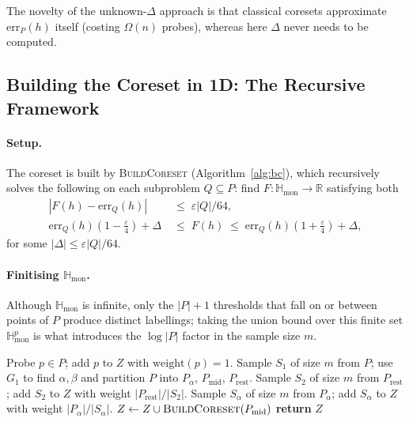 \documentclass[11pt, a4paper]{article}
\theoremstyle{boxed}
\newcommand{\R}{\mathbb{R}}
\newcommand{\Hmon}{\mathbb{H}_{\mathrm{mon}}}
\begin{document}
The novelty of the unknown-$\Delta$ approach is that classical coresets approximate $\mathrm{err}_P(h)$ itself (costing $\Omega(n)$ probes), whereas here $\Delta$ never needs to be computed.

\subsection{Building the Coreset in 1D: The Recursive Framework}
 
\paragraph{Setup.}
The coreset is built by \textsc{BuildCoreset} (Algorithm~\ref{alg:bc}),
which recursively solves the following on each subproblem $Q \subseteq P$:
find $F : \Hmon \to \R$ satisfying both
\begin{align}
  |F(h) - \mathrm{err}_Q(h)| &\;\le\; \varepsilon|Q|/64, \label{eq:p2abs}\\
  \mathrm{err}_Q(h)\!\left(1-\tfrac{\varepsilon}{4}\right) + \Delta
  &\;\le\; F(h) \;\le\;
  \mathrm{err}_Q(h)\!\left(1+\tfrac{\varepsilon}{4}\right) + \Delta, \label{eq:p2rel}
\end{align}
for some $|\Delta| \le \varepsilon|Q|/64$.
 
\paragraph{Finitising $\Hmon$.}
Although $\Hmon$ is infinite, only the $|P|+1$ thresholds that fall on or between points of $P$ produce distinct labellings; taking the union bound over this finite set $\Hmon^p$ is what introduces the $\log|P|$ factor in the sample size $m$.

\begin{algorithm}
\caption{\textsc{BuildCoreset}($P$)}\label{alg:bc}
\begin{algorithmic}[1]
    \STATE Probe $p \in P$; add $p$ to $Z$ with $\mathrm{weight}(p) = 1$.
\ELSE
    \STATE Sample $S_1$ of size $m$ from $P$; use $G_1$ to find $\alpha, \beta$ and
           partition $P$ into $P_\alpha$, $P_{\mathrm{mid}}$, $P_{\mathrm{rest}}$.
        \STATE Sample $S_2$ of size $m$ from $P_{\mathrm{rest}}$;
               add $S_2$ to $Z$ with weight $|P_{\mathrm{rest}}|/|S_2|$.
    \ENDIF
        \STATE Sample $S_\alpha$ of size $m$ from $P_\alpha$;
               add $S_\alpha$ to $Z$ with weight $|P_\alpha|/|S_\alpha|$.
    \ENDIF
    \STATE $Z \gets Z \cup \textsc{BuildCoreset}(P_{\mathrm{mid}})$
\ENDIF
\STATE \textbf{return} $Z$
\end{algorithmic}
\end{algorithm}
\end{document}
